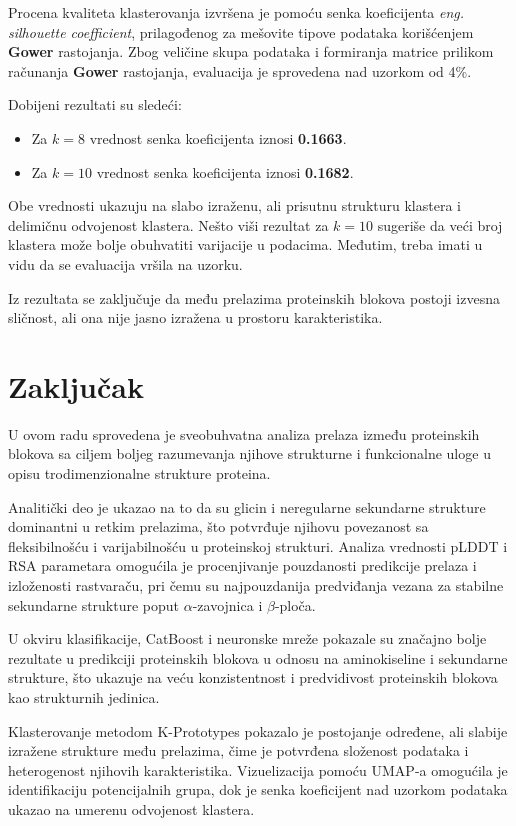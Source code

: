 \documentclass[a4paper,12pt]{article}
\begin{document}
Procena kvaliteta klasterovanja izvršena je pomoću senka koeficijenta \textit{eng. silhouette coefficient}, prilagođenog za mešovite tipove podataka korišćenjem \textbf{Gower} rastojanja. Zbog veličine skupa podataka i formiranja matrice prilikom računanja \textbf{Gower} rastojanja, evaluacija je sprovedena nad uzorkom od 4\%. 

Dobijeni rezultati su sledeći:
\begin{itemize}
    \item Za $k=8$ vrednost senka koeficijenta iznosi \textbf{0.1663}.
    \item Za $k=10$ vrednost senka koeficijenta iznosi \textbf{0.1682}.
\end{itemize}

Obe vrednosti ukazuju na slabo izraženu, ali prisutnu strukturu klastera i delimičnu odvojenost klastera. Nešto viši rezultat za $k=10$ sugeriše da veći broj klastera može bolje obuhvatiti varijacije u podacima. Međutim, treba imati u vidu da se evaluacija vršila na uzorku.

Iz rezultata se zaključuje da među prelazima proteinskih blokova postoji izvesna sličnost, ali ona nije jasno izražena u prostoru karakteristika.
\newpage
\section{Zaključak}
U ovom radu sprovedena je sveobuhvatna analiza prelaza između proteinskih blokova sa ciljem boljeg razumevanja njihove strukturne i funkcionalne uloge u opisu trodimenzionalne strukture proteina.

Analitički deo je ukazao na to da su glicin i neregularne sekundarne strukture dominantni u retkim prelazima, što potvrđuje njihovu povezanost sa fleksibilnošću i varijabilnošću u proteinskoj strukturi. Analiza vrednosti pLDDT i RSA parametara omogućila je procenjivanje pouzdanosti predikcije prelaza i izloženosti rastvaraču, pri čemu su najpouzdanija predviđanja vezana za stabilne sekundarne strukture poput $\alpha$-zavojnica i $\beta$-ploča.

U okviru klasifikacije, CatBoost i neuronske mreže pokazale su značajno bolje rezultate u predikciji proteinskih blokova u odnosu na aminokiseline i sekundarne strukture, što ukazuje na veću konzistentnost i predvidivost proteinskih blokova kao strukturnih jedinica.

Klasterovanje metodom K-Prototypes pokazalo je postojanje određene, ali slabije izražene strukture među prelazima, čime je potvrđena složenost podataka i heterogenost njihovih karakteristika. Vizuelizacija pomoću UMAP-a omogućila je identifikaciju potencijalnih grupa, dok je senka koeficijent nad uzorkom podataka ukazao na umerenu odvojenost klastera.
\end{document}
